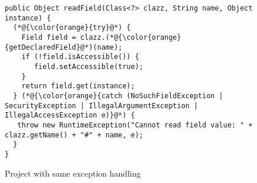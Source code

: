 \begin{figure}[htbp]
	\centering
\begin{lstlisting}[]
public Object readField(Class<?> clazz, String name, Object instance) {
  (*@{\color{orange}{try}@*) {
    Field field = clazz.(*@{\color{orange}{getDeclaredField}@*)(name);
    if (!field.isAccessible()) {
       field.setAccessible(true);
    }
    return field.get(instance);
  } (*@{\color{orange}{catch (NoSuchFieldException | SecurityException | IllegalArgumentException | IllegalAccessException e)}@*) {
   throw new RuntimeException("Cannot read field value: " + clazz.getName() + "#" + name, e);
  }
}
\end{lstlisting}
        \vspace{-16pt}
        \caption{Project  with same exception handling}
        \label{fig:example3}
\end{figure}
